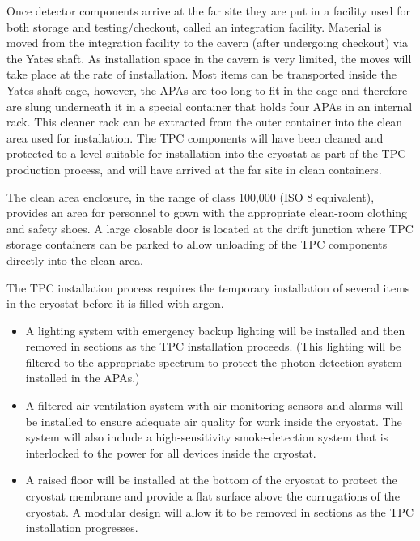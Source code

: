 Once detector components arrive at the far site they are put in a
facility used for both storage and testing/checkout, called an integration facility.  
Material is moved from the
integration facility to the cavern (after undergoing checkout)  via the Yates shaft. 
As installation space in
the cavern is very limited, the moves will take place at the rate of installation. 
 Most items can be
transported inside the Yates shaft cage, however, the APAs are too
long to fit in the cage and therefore are slung underneath it in a special %
container that holds four APAs 
in an internal rack. %
This cleaner rack %
can be extracted from the outer container into the clean area used for installation.
The TPC components will have been cleaned and
protected to a level suitable for installation into the cryostat as
part of the TPC production process, and will %
have arrived at the far
site in clean containers.

The clean area enclosure, in the range of class 100,000 (ISO 8
equivalent), %
provides an area for personnel to gown with the appropriate
clean-room clothing and safety shoes. A large closable door is
located at the drift junction where TPC storage containers can be
parked to allow unloading of the TPC components 
directly %
into the clean area. 

The TPC installation process requires the temporary installation of several 
items in the cryostat before it is filled with argon.
\begin{itemize}
\item A lighting system with emergency backup lighting will be installed and then removed in sections
as the TPC installation proceeds. (This lighting will be filtered
to the appropriate spectrum to protect the photon detection system
installed in the APAs.) 
\item A filtered air ventilation system
with air-monitoring sensors and alarms will be installed to ensure adequate air
quality for work inside the cryostat. The system will also include a
high-sensitivity smoke-detection system that is interlocked to the
power for all devices inside the cryostat. 
\item A raised floor will be
installed at the bottom of the cryostat to protect the cryostat
membrane and provide a flat surface above the corrugations of the
cryostat. A modular design will allow it to be removed
in sections as the TPC installation progresses.
\end{itemize}



